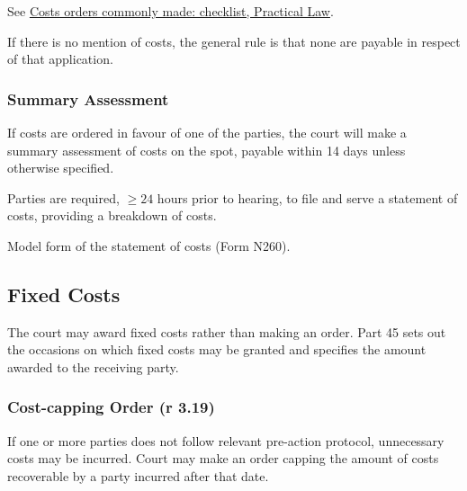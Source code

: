 \documentclass[
]{article}
\begin{document}
See
\href{https://uk.westlaw.com/Document/Idfa75d80e25211e398db8b09b4f043e0/View/FullText.html?navigationPath=Search\%2Fv1\%2Fresults\%2Fnavigation\%2Fi0ad7401100000182351e1646a78eccc7\%3Fppcid\%3Dc0a980e2f5064b068470b2d9a1d8da35\%26Nav\%3DKNOWHOW_UK\%26fragmentIdentifier\%3DIdfa75d80e25211e398db8b09b4f043e0\%26parentRank\%3D0\%26startIndex\%3D1\%26contextData\%3D\%2528sc.Search\%2529\%26transitionType\%3DSearchItem\&listSource=Search\&listPageSource=44bcbc1c4ad1b703331d2ac9478bb7c7\&list=KNOWHOW_UK\&rank=4\&sessionScopeId=41ee73cb61e521307cbc865612f79b4a57e9843873b7cea25b7a1d4abfd584fc\&ppcid=c0a980e2f5064b068470b2d9a1d8da35\&originationContext=Search\%20Result\&transitionType=SearchItem\&contextData=(sc.Search)\&comp=pluk}{Costs
orders commonly made: checklist, Practical Law}.

If there is no mention of costs, the general rule is that none are
payable in respect of that application.

\hypertarget{summary-assessment}{%
\subsubsection{Summary Assessment}\label{summary-assessment}}

If costs are ordered in favour of one of the parties, the court will
make a summary assessment of costs on the spot, payable within 14 days
unless otherwise specified.

Parties are required, \(\geq 24\) hours prior to hearing, to file and
serve a statement of costs, providing a breakdown of costs.

Model form of the statement of costs (Form N260).

\hypertarget{fixed-costs}{%
\subsection{Fixed Costs}\label{fixed-costs}}

The court may award fixed costs rather than making an order. Part 45
sets out the occasions on which fixed costs may be granted and specifies
the amount awarded to the receiving party.

\hypertarget{cost-capping-order-r-3.19}{%
\subsubsection{Cost-capping Order (r
3.19)}\label{cost-capping-order-r-3.19}}

If one or more parties does not follow relevant pre-action protocol,
unnecessary costs may be incurred. Court may make an order capping the
amount of costs recoverable by a party incurred after that date.
\end{document}
